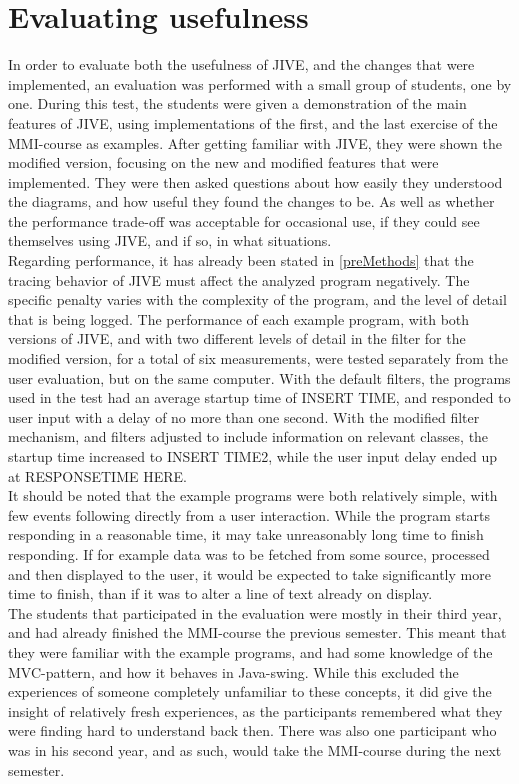 \section{Evaluating usefulness}\label{jiveEval}
In order to evaluate both the usefulness of JIVE, and the changes that were implemented, an evaluation was performed with a small group of students, one by one.
During this test, the students were given a demonstration of the main features of JIVE, using implementations of the first, and the last exercise of the MMI-course as examples.
After getting familiar with JIVE, they were shown the modified version, focusing on the new and modified features that were implemented.
They were then asked questions about how easily they understood the diagrams, and how useful they found the changes to be.
As well as whether the performance trade-off was acceptable for occasional use, if they could see themselves using JIVE, and if so, in what situations.
~\\

Regarding performance, it has already been stated in \autoref{preMethods} that the tracing behavior of JIVE must affect the analyzed program negatively.
The specific penalty varies with the complexity of the program, and the level of detail that is being logged.
The performance of each example program, with both versions of JIVE, and with two different levels of detail in the filter for the modified version, for a total of six measurements, were tested separately from the user evaluation, but on the same computer.
With the default filters, the programs used in the test had an average startup time of INSERT TIME, and responded to user input with a delay of no more than one second.
With the modified filter mechanism, and filters adjusted to include information on relevant classes, the startup time increased to INSERT TIME2, while the user input delay ended up at RESPONSETIME HERE.
~\\

It should be noted that the example programs were both relatively simple, with few events following directly from a user interaction.
While the program starts responding in a reasonable time, it may take unreasonably long time to finish responding.
If for example data was to be fetched from some source, processed and then displayed to the user, it would be expected to take significantly more time to finish, than if it was to alter a line of text already on display.
~\\

The students that participated in the evaluation were mostly in their third year, and had already finished the MMI-course the previous semester.
This meant that they were familiar with the example programs, and had some knowledge of the MVC-pattern, and how it behaves in Java-swing.
While this excluded the experiences of someone completely unfamiliar to these concepts, it did give the insight of relatively fresh experiences, as the participants remembered what they were finding hard to understand back then.
There was also one participant who was in his second year, and as such, would take the MMI-course during the next semester.
~\\

